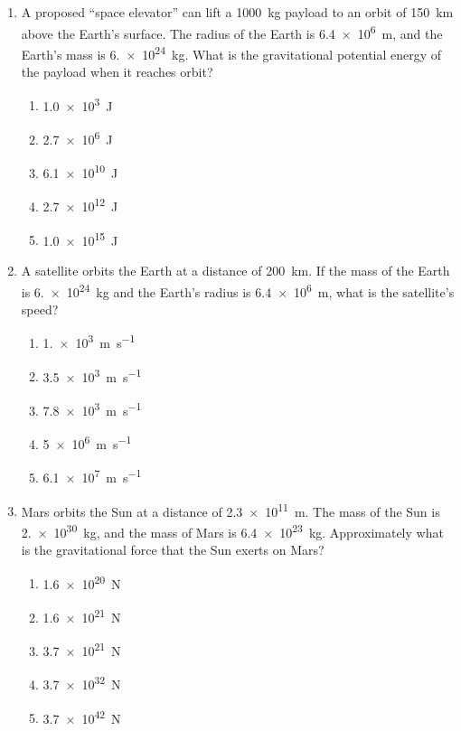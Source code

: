 \documentclass{../../../oss-apphys}
\begin{document}
\begin{multicols}{2}
\begin{enumerate}[leftmargin=18pt]
  \item A proposed ``space elevator'' can lift a \SI{1000}{\kilo\gram} payload
    to an orbit of \SI{150}{\kilo\metre} above the Earth's surface. The radius
    of the Earth is \SI{6.4e6}{\metre}, and the Earth's mass is
    \SI{6.e24}{\kilo\gram}. What is the gravitational potential energy of the
    payload when it reaches orbit?
    \begin{enumerate}[noitemsep,topsep=0pt,leftmargin=18pt,label=(\Alph*)]
    \item\SI{1.0e3}{\joule}
    \item\SI{2.7e6}{\joule}
    \item\SI{6.1e10}{\joule}
    \item\SI{2.7e12}{\joule}
    \item\SI{1.0e15}{\joule}
    \end{enumerate}

  \item A satellite orbits the Earth at a distance of \SI{200}{\km}. If the mass
    of the Earth is \SI{6.e24}{\kilo\gram} and the Earth's radius is
    \SI{6.4e6}{\metre}, what is the satellite's speed?
    \begin{enumerate}[noitemsep,topsep=0pt,leftmargin=18pt,label=(\Alph*)]
    \item\SI{1.e3}{\metre\per\second}
    \item\SI{3.5e3}{\metre\per\second}
    \item\SI{7.8e3}{\metre\per\second}
    \item\SI{5e6}{\metre\per\second}
    \item\SI{6.1e7}{\metre\per\second}
    \end{enumerate}

  \item Mars orbits the Sun at a distance of \SI{2.3e11}{\metre}. The mass of
    the Sun is \SI{2.e30}{\kilo\gram}, and the mass of Mars is
    \SI{6.4e23}{\kilo\gram}. Approximately what is the gravitational force that
    the Sun exerts on Mars?
    \begin{enumerate}[noitemsep,topsep=0pt,leftmargin=18pt,label=(\Alph*)]
    \item\SI{1.6e20}{\newton}
    \item\SI{1.6e21}{\newton}
    \item\SI{3.7e21}{\newton}
    \item\SI{3.7e32}{\newton}
    \item\SI{3.7e42}{\newton}
    \end{enumerate}
    \columnbreak
    

\end{enumerate}
\end{multicols}
\end{document}
